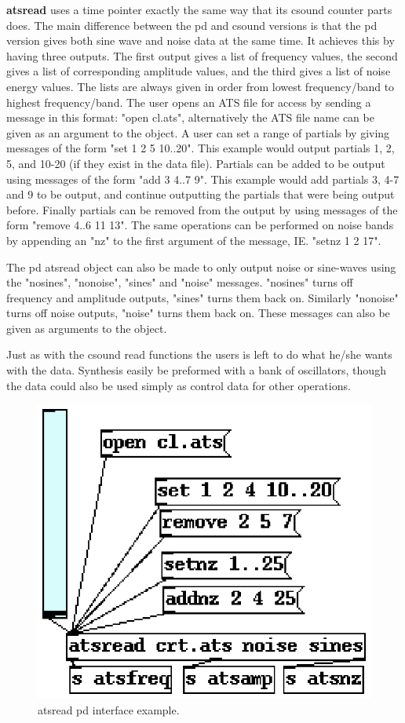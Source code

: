\documentclass[10pt,letterpaper]{article}
\begin{document}
\textbf{atsread} uses a time pointer exactly the same way that its csound counter parts does.  The main difference between the pd and csound versions is that the pd version gives both sine wave and noise data at the same time.  It achieves this by having three outputs.  The first output gives a list of frequency values, the second gives a list of corresponding amplitude values, and the third gives a list of noise energy values.  The lists are always given in order from lowest frequency/band to highest frequency/band.  The user opens an ATS file for access by sending a message in this format: "open cl.ats", alternatively the ATS file name can be given as an argument to the object.  A user can set a range of partials by giving messages of the form "set 1 2 5 10..20".  This example would output partials 1, 2, 5, and 10-20 (if they exist in the data file).  Partials can be added to be output using messages of the form "add 3 4..7 9".  This example would add partials 3, 4-7 and 9 to be output, and continue outputting the partials that were being output before.  Finally partials can be removed from the output by using messages of the form "remove 4..6 11 13".  The same operations can be performed on noise bands by appending an "nz" to the first argument of the message, IE. "setnz 1 2 17".

The pd atsread object can also be made to only output noise or sine-waves using the "nosines", "nonoise", "sines" and "noise" messages.  "nosines" turns off frequency and amplitude outputs, "sines" turns them back on.  Similarly "nonoise" turns off noise outputs, "noise" turns them back on.  These messages can also be given as arguments to the object.

Just as with the csound read functions the users is left to do what he/she wants with the data.  Synthesis easily be preformed with a bank of oscillators, though the data could also be used simply as control data for other operations.


\begin{figure}[htb]
	\begin{center}
	\includegraphics{ats-pd-example.eps}
	\caption{atsread pd interface example.}
	\label{fig:emptybox}
	\end{center}
\end{figure}
\end{document}
